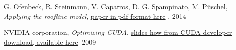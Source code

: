 \documentclass[12pt]{report}
\begin{document}
\begin{thebibliography}{9}
		G. Ofenbeck, R. Steinmann, V. Caparros, D. G. Spampinato, M. Püschel, \textit{Applying the roofline model},  \href{http://spiral.ece.cmu.edu:8080/pub-spiral/pubfile/ispass-2013\_177.pdf}{paper in pdf format here}  , 2014
		
		NVIDIA corporation, \textit{Optimizing CUDA}, \href{http://developer.download.nvidia.com/CUDA/training/NVIDIA_GPU_Computing_Webinars_CUDA_Optimization_April-2009.pdf}{slides how from CUDA developer download, available here}, 2009
		
		
		
		
		
		
	\end{thebibliography}

\end{document}
